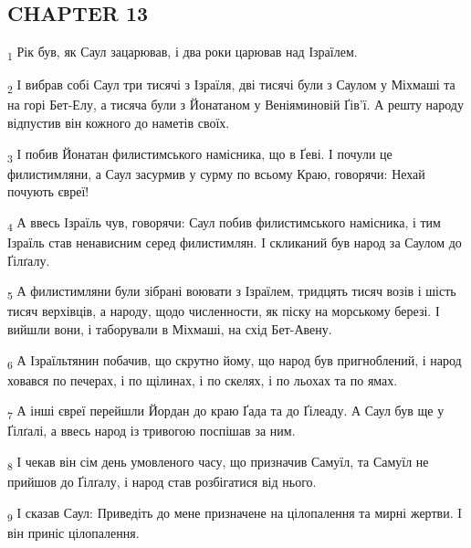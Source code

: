 \subsection{CHAPTER 13}
\begin{tcolorbox}
\textsubscript{1} Рік був, як Саул зацарював, і два роки царював над Ізраїлем.
\end{tcolorbox}
\begin{tcolorbox}
\textsubscript{2} І вибрав собі Саул три тисячі з Ізраїля, дві тисячі були з Саулом у Міхмаші та на горі Бет-Елу, а тисяча були з Йонатаном у Веніяминовій Ґів'ї. А решту народу відпустив він кожного до наметів своїх.
\end{tcolorbox}
\begin{tcolorbox}
\textsubscript{3} І побив Йонатан филистимського намісника, що в Ґеві. І почули це филистимляни, а Саул засурмив у сурму по всьому Краю, говорячи: Нехай почують євреї!
\end{tcolorbox}
\begin{tcolorbox}
\textsubscript{4} А ввесь Ізраїль чув, говорячи: Саул побив филистимського намісника, і тим Ізраїль став ненависним серед филистимлян. І скликаний був народ за Саулом до Ґілґалу.
\end{tcolorbox}
\begin{tcolorbox}
\textsubscript{5} А филистимляни були зібрані воювати з Ізраїлем, тридцять тисяч возів і шість тисяч верхівців, а народу, щодо численности, як піску на морському березі. І вийшли вони, і таборували в Міхмаші, на схід Бет-Авену.
\end{tcolorbox}
\begin{tcolorbox}
\textsubscript{6} А Ізраїльтянин побачив, що скрутно йому, що народ був пригноблений, і народ ховався по печерах, і по щілинах, і по скелях, і по льохах та по ямах.
\end{tcolorbox}
\begin{tcolorbox}
\textsubscript{7} А інші євреї перейшли Йордан до краю Ґада та до Ґілеаду. А Саул був ще у Ґілґалі, а ввесь народ із тривогою поспішав за ним.
\end{tcolorbox}
\begin{tcolorbox}
\textsubscript{8} І чекав він сім день умовленого часу, що призначив Самуїл, та Самуїл не прийшов до Ґілґалу, і народ став розбігатися від нього.
\end{tcolorbox}
\begin{tcolorbox}
\textsubscript{9} І сказав Саул: Приведіть до мене призначене на цілопалення та мирні жертви. І він приніс цілопалення.
\end{tcolorbox}
